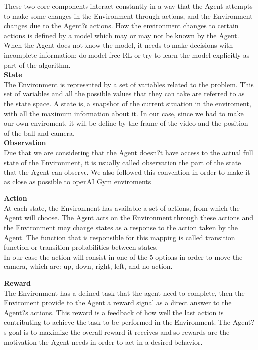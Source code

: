 These two core components interact constantly in a way that the Agent attempts to make some changes in  the Environment through actions, and the Environment changes due to the Agent?s actions. How the environment changes to certain actions is defined by a model which may or may not be known by the Agent.\\


When the Agent does not know the model, it needs to make decisions with incomplete information; do model-free RL or try to learn the model explicitly as part of the algorithm.\\

\textbf{State}\\
The Environment is represented by a set of variables related to the problem. This set of variables and all the possible values that they can take are referred to as the state space. A state is, a snapshot of the current situation in the enviroment, with all the maximum information about it. In our case, since we had to make our own enviroment, it will be define by the frame of the video and the position of the ball and camera.\\

\textbf{Observation}\\
Due that we are considering that the Agent doesn?t have access to the actual full state of the Environment, it is usually called observation the part of the state that the Agent can observe. We also followed this convention in order to make it as close as possible to openAI Gym enviroments


\textbf{Action}\\
At each state, the Environment has available a set of actions, from which the Agent will choose. The Agent acts on the Environment through these actions and the Environment may change states as a response to the action taken by the Agent. The function that is responsible for this mapping is called transition function or transition probabilities between states.\\

In our case the action will consist in one of the 5 options in order to move the camera, which are: up, down, right, left, and no-action.


\textbf{Reward}\\
The Environment has a defined task that the agent need to complete, then the Enviroment provide to the Agent a reward signal as a direct answer to the Agent?s actions. This reward is a feedback of how well the last action is contributing to achieve the task to be performed in the Environment. The Agent?s goal is to maximize the overall reward it receives and so rewards are the motivation the Agent needs in order to act in a desired behavior.

